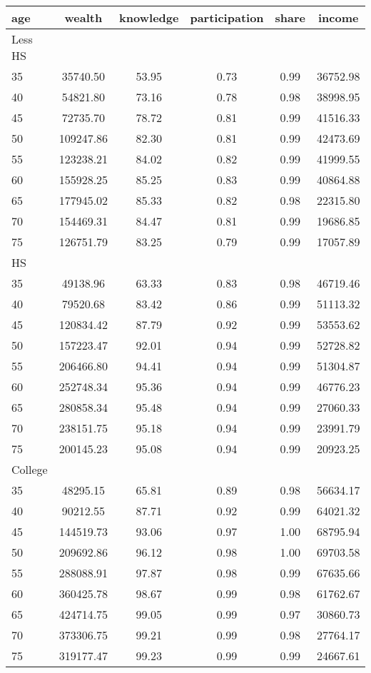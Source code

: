  \begin{tabular}{lccccc}
 \hline \hline
  age & wealth & knowledge & participation & share & income \\
 \hline
 Less HS & & & & & \\
 \hline
35 &  35740.50 &     53.95 &      0.73 &      0.99 &  36752.98 \\ 
40 &  54821.80 &     73.16 &      0.78 &      0.98 &  38998.95 \\ 
45 &  72735.70 &     78.72 &      0.81 &      0.99 &  41516.33 \\ 
50 & 109247.86 &     82.30 &      0.81 &      0.99 &  42473.69 \\ 
55 & 123238.21 &     84.02 &      0.82 &      0.99 &  41999.55 \\ 
60 & 155928.25 &     85.25 &      0.83 &      0.99 &  40864.88 \\ 
65 & 177945.02 &     85.33 &      0.82 &      0.98 &  22315.80 \\ 
70 & 154469.31 &     84.47 &      0.81 &      0.99 &  19686.85 \\ 
75 & 126751.79 &     83.25 &      0.79 &      0.99 &  17057.89 \\ 
 \hline
 HS & & & & & \\
 \hline
35 &  49138.96 &     63.33 &      0.83 &      0.98 &  46719.46 \\ 
40 &  79520.68 &     83.42 &      0.86 &      0.99 &  51113.32 \\ 
45 & 120834.42 &     87.79 &      0.92 &      0.99 &  53553.62 \\ 
50 & 157223.47 &     92.01 &      0.94 &      0.99 &  52728.82 \\ 
55 & 206466.80 &     94.41 &      0.94 &      0.99 &  51304.87 \\ 
60 & 252748.34 &     95.36 &      0.94 &      0.99 &  46776.23 \\ 
65 & 280858.34 &     95.48 &      0.94 &      0.99 &  27060.33 \\ 
70 & 238151.75 &     95.18 &      0.94 &      0.99 &  23991.79 \\ 
75 & 200145.23 &     95.08 &      0.94 &      0.99 &  20923.25 \\ 
 \hline
 College & & & & & \\
 \hline
35 &  48295.15 &     65.81 &      0.89 &      0.98 &  56634.17 \\ 
40 &  90212.55 &     87.71 &      0.92 &      0.99 &  64021.32 \\ 
45 & 144519.73 &     93.06 &      0.97 &      1.00 &  68795.94 \\ 
50 & 209692.86 &     96.12 &      0.98 &      1.00 &  69703.58 \\ 
55 & 288088.91 &     97.87 &      0.98 &      0.99 &  67635.66 \\ 
60 & 360425.78 &     98.67 &      0.99 &      0.98 &  61762.67 \\ 
65 & 424714.75 &     99.05 &      0.99 &      0.97 &  30860.73 \\ 
70 & 373306.75 &     99.21 &      0.99 &      0.98 &  27764.17 \\ 
75 & 319177.47 &     99.23 &      0.99 &      0.99 &  24667.61 \\ 
 \hline \hline
 \end{tabular}
